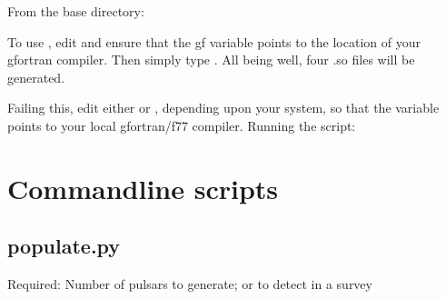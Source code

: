 \documentclass[letterpaper,10pt,english]{sphinxmanual}
\begin{document}
\sphinxAtStartPar
From the base directory:

\begin{sphinxVerbatim}[commandchars=\\\{\}]
 
\end{sphinxVerbatim}

\sphinxAtStartPar
To use , edit  and ensure that the gf variable
points to the location of your gfortran compiler. Then simply type .
All being well, four .so files will be generated.

\sphinxAtStartPar
Failing this, edit either  or , depending upon
your system, so that the  variable points to your local gfortran/f77
compiler. Running the script:

\begin{sphinxVerbatim}[commandchars=\\\{\}]
 
\end{sphinxVerbatim}

\sphinxstepscope


\chapter{Command\sphinxhyphen{}line scripts}
\label{\detokenize{cmd-line-docs:command-line-scripts}}\label{\detokenize{cmd-line-docs:command-line-docs}}\label{\detokenize{cmd-line-docs::doc}}

\section{populate.py}
\label{\detokenize{cmd-line-docs:populate-py}}\label{\detokenize{cmd-line-docs:populate-docs}}

\begin{fulllineitems}
\label{\detokenize{cmd-line-docs:cmdoption-populate.py-n}}
\pysigstartsignatures
\pysigline
{}
\pysigstopsignatures
\sphinxAtStartPar
Required: Number of pulsars to generate; or to detect in a survey

\end{fulllineitems}
\end{document}
